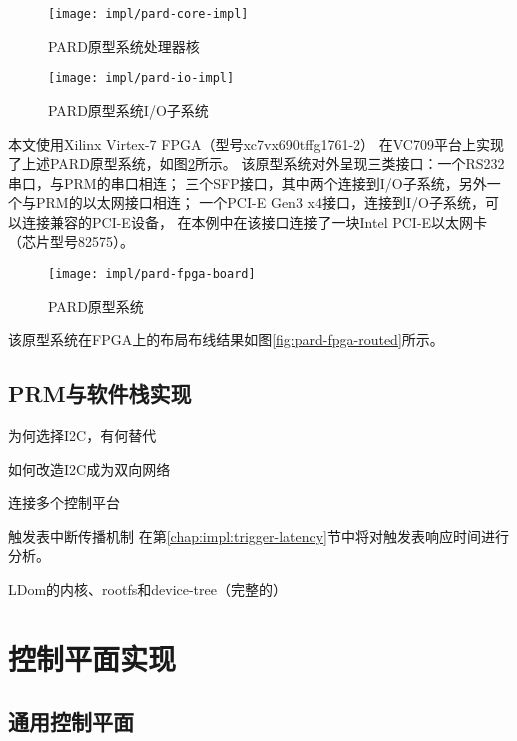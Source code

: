 \begin{figure}[b]
\begin{minipage}{0.48\textwidth}
  \centering
  \texttt{[image: impl/pard-core-impl]}
  \caption{PARD原型系统处理器核}
  \label{fig:pard-core-impl}
\end{minipage}\hfill
\begin{minipage}{0.48\textwidth}
  \centering
  \texttt{[image: impl/pard-io-impl]}
  \caption{PARD原型系统I/O子系统}
  \label{fig:pard-io-impl}
\end{minipage}
\end{figure}

本文使用Xilinx Virtex-7 FPGA（型号xc7vx690tffg1761-2）
在VC709平台上实现了上述PARD原型系统，如图\ref{fig:pard-fpga-board}所示。
该原型系统对外呈现三类接口：一个RS232串口，与PRM的串口相连；
三个SFP接口，其中两个连接到I/O子系统，另外一个与PRM的以太网接口相连；
一个PCI-E Gen3 x4接口，连接到I/O子系统，可以连接兼容的PCI-E设备，
在本例中在该接口连接了一块Intel PCI-E以太网卡（芯片型号82575）。

\begin{figure}[tb]
  \centering
  \texttt{[image: impl/pard-fpga-board]}
  \caption{PARD原型系统}
  \label{fig:pard-fpga-board}
\end{figure}

该原型系统在FPGA上的布局布线结果如图\ref{fig:pard-fpga-routed}所示。



\subsection{PRM与软件栈实现}

为何选择I2C，有何替代

如何改造I2C成为双向网络

连接多个控制平台

触发表中断传播机制
在第\ref{chap:impl:trigger-latency}节中将对触发表响应时间进行分析。


LDom的内核、rootfs和device-tree（完整的）


\section{控制平面实现}

\subsection{通用控制平面}

